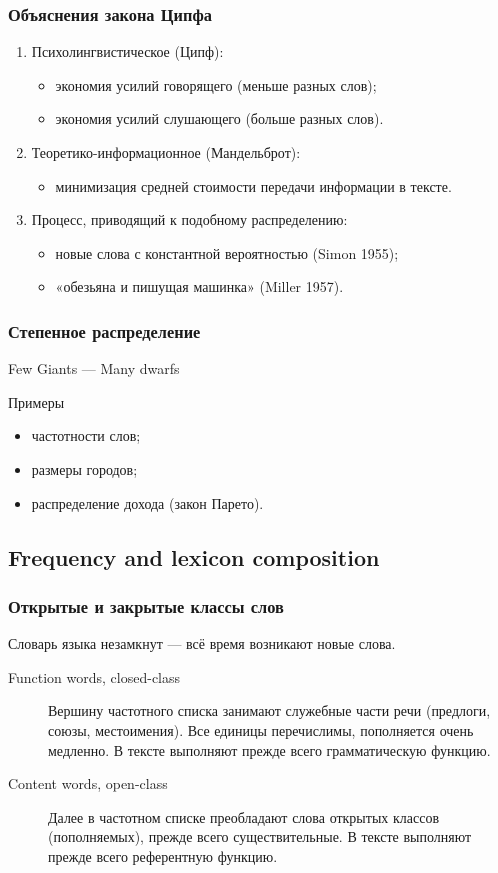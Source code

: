 \documentclass[svgnames]{beamer}
\begin{document}
\begin{frame}
  \frametitle{Объяснения закона Ципфа}
  \begin{enumerate}
  \item Психолингвистическое (Ципф):
    \begin{itemize}
    \item экономия усилий говорящего (меньше разных слов);
    \item экономия усилий слушающего (больше разных слов).
    \end{itemize}
  \item Теоретико-информационное (Мандельброт):
    \begin{itemize}
    \item минимизация средней стоимости передачи информации в тексте.
    \end{itemize}
  \item Процесс, приводящий к подобному распределению:
    \begin{itemize}
    \item новые слова с константной вероятностью (Simon 1955);
    \item «обезьяна и пишущая машинка» (Miller 1957).
    \end{itemize}
  \end{enumerate}
\end{frame}


\begin{frame}
  \frametitle{Степенное распределение}
  
  Few Giants — Many dwarfs

  \begin{block}{Примеры}
  \begin{itemize}
  \item частотности слов;
  \item размеры городов;
  \item распределение дохода (закон Парето).
  \end{itemize}    
  \end{block}
\end{frame}

\subsection{Frequency and lexicon composition}

  \begin{frame}
    \frametitle{Открытые и закрытые классы слов}
      Словарь языка незамкнут — всё время возникают новые слова.
    \begin{description}
    \item[Function words, closed-class] 
      Вершину частотного списка занимают служебные части речи
      (\alert{предлоги, союзы, местоимения}). Все единицы перечислимы,
      пополняется очень медленно. В тексте выполняют прежде всего
      грамматическую функцию. 
    \item[Content words, open-class]
      Далее в частотном списке преобладают слова открытых классов (пополняемых), прежде
      всего \alert{существительные}. В тексте выполняют прежде всего
      референтную функцию.
    \end{description}
  \end{frame}
\end{document}
